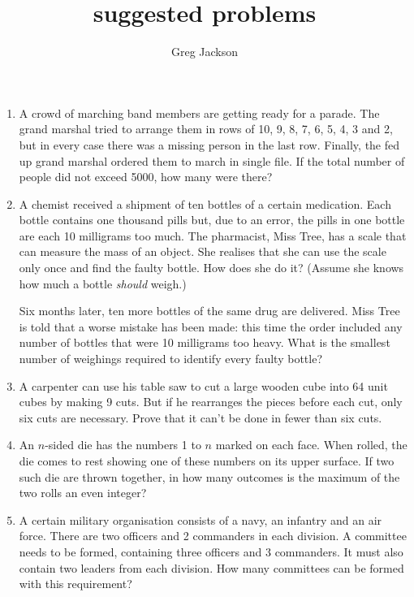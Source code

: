 \documentclass{article}
\title{suggested problems}
\author{Greg Jackson}
\begin{document}
\maketitle

\begin{enumerate}
  \item %
  A crowd of marching band members are getting ready for a parade.
  The grand marshal tried to arrange them in rows of 10, 9, 8, 7, 6, 5, 4, 3 and 2, but in every case there was a missing person in the last row.
  Finally, the fed up grand marshal ordered them to march in single file.
  If the total number of people did not exceed 5000, how many were there?

  \item %
  A chemist received a shipment of ten bottles of a certain medication.
  Each bottle contains one thousand pills but, due to an error, the pills in one bottle are each 10 milligrams too much.
  The pharmacist, Miss Tree, has a scale that can measure the mass of an object.
  She realises that she can use the scale only once and find the faulty bottle.
  How does she do it? (Assume she knows how much a bottle \emph{should} weigh.)

  Six months later, ten more bottles of the same drug are delivered.
  Miss Tree is told that a worse mistake has been made: this time the order included any number of bottles that were 10 milligrams too heavy.
  What is the smallest number of weighings required to identify every faulty bottle?

  \item
  A carpenter can use his table saw to cut a large wooden cube into 64 unit cubes by making 9 cuts.
  But if he rearranges the pieces before each cut, only six cuts are necessary.
  Prove that it can't be done in fewer than six cuts.

  \item
  An $n$-sided die has the numbers 1 to $n$ marked on each face.
  When rolled, the die comes to rest showing one of these numbers on its upper surface.
  If two such die are thrown together, in how many outcomes is the maximum of the two rolls an even integer?

  \item
  A certain military organisation consists of a navy, an infantry and an air force. 
  There are two officers and 2 commanders in each division. A committee needs to be formed, containing three officers and 3 commanders.
  It must also contain two leaders from each division. 
  How many committees can be formed with this requirement?


\end{enumerate}
\end{document}
